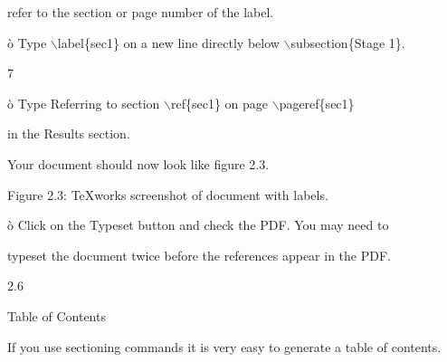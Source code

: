 \documentclass[a4paper,portrait,12pt]{article}
\begin{document}
\begin{flushleft}
refer to the section or page number of the label.
\end{flushleft}


\begin{flushleft}
\`{o} Type \ensuremath{\backslash}label\{sec1\} on a new line directly below \ensuremath{\backslash}subsection\{Stage 1\}.
\end{flushleft}


7





\begin{flushleft}
\newpage
\`{o} Type Referring to section \ensuremath{\backslash}ref\{sec1\} on page \ensuremath{\backslash}pageref\{sec1\}
\end{flushleft}


\begin{flushleft}
in the Results section.
\end{flushleft}


\begin{flushleft}
Your document should now look like figure 2.3.
\end{flushleft}





\begin{flushleft}
Figure 2.3: TeXworks screenshot of document with labels.
\end{flushleft}





\begin{flushleft}
\`{o} Click on the Typeset button and check the PDF. You may need to
\end{flushleft}


\begin{flushleft}
typeset the document twice before the references appear in the PDF.
\end{flushleft}





2.6





\begin{flushleft}
Table of Contents
\end{flushleft}





\begin{flushleft}
If you use sectioning commands it is very easy to generate a table of contents.
\end{flushleft}
\end{document}
